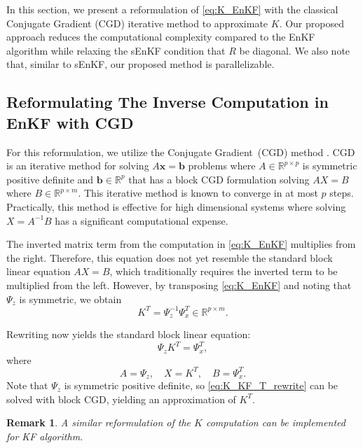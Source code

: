 \documentclass[11p]{elsarticle}
\numberwithin{equation}{section}
\newtheorem{remark}{Remark}
\newcommand{\vect}[1]{\ensuremath{\bm{#1}}}
\begin{document}
In this section, we present a reformulation of \eqref{eq:K_EnKF} with the classical Conjugate Gradient (CGD) iterative method to approximate $K$. 
Our proposed approach reduces the computational complexity compared to the EnKF algorithm while relaxing the sEnKF condition that $R$ be diagonal.  We also note that, similar to sEnKF, our proposed method is parallelizable.




\subsection{Reformulating The Inverse Computation in EnKF with CGD}
\label{sec:inverseComp}


For this reformulation, we utilize the Conjugate Gradient~(CGD) method \cite{Hestenes1952}.  
CGD is an iterative method for solving $A\vect{x}=\vect{b}$ problems where $A \in {\mathbb{R}^{p \times p}}$ is symmetric positive definite and $\vect{b}\in {\mathbb{R}^p}$ that has a block CGD formulation solving $AX=B$ where $B\in {\mathbb{R}^{p\times m}}$.  This iterative method is known to converge in at most {$p$} steps.  Practically, this method is effective for high dimensional systems where solving $X=A^{-1}B$ has a significant computational expense.


The inverted matrix term from the computation in \eqref{eq:K_EnKF} multiplies from the right.  Therefore, this equation does not yet resemble the standard block linear equation $AX=B$, which traditionally requires the inverted term to be multiplied from the left.  However, by transposing \eqref{eq:K_EnKF} and noting that $\Psi_{z}$ is symmetric, we obtain
\begin{equation}
    K^T= \Psi_{z}^{-1} \Psi_{x}^T \in \mathbb{R}^{p \times m}.
\label{eq:K_KF_T}
\end{equation}

Rewriting now yields the standard block linear equation:
\begin{equation}
\Psi_{z} K^T= \Psi_{x}^T,
\label{eq:K_KF_T_rewrite}
\end{equation}
where
\begin{equation}
A=\Psi_{z}, \quad X = K^T, \quad B = \Psi_{x}^T.
\end{equation}
Note that $\Psi_{z}$ is symmetric positive definite, so \eqref{eq:K_KF_T_rewrite} can be solved with block CGD, yielding an approximation of $K^T$.

\begin{remark}
A similar reformulation of the $K$ computation can be implemented for KF algorithm.
\end{remark}
\end{document}
